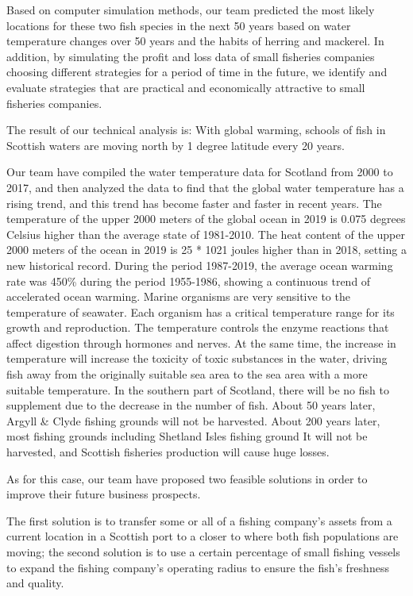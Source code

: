 \documentclass{mcmthesis}
\numberwithin{figure}{section}
\numberwithin{table}{section}
\begin{document}
Based on computer simulation methods, our team predicted the most likely locations for these two fish species in the next 50 years based on water temperature changes over 50 years and the habits of herring and mackerel. In addition, by simulating the profit and loss data of small fisheries companies choosing different strategies for a period of time in the future, we identify and evaluate strategies that are practical and economically attractive to small fisheries companies.

The result of our technical analysis is: With global warming, schools of fish in Scottish waters are moving north by 1 degree latitude every 20 years.

Our team have compiled the water temperature data for Scotland from 2000 to 2017, and then analyzed the data to find that the global water temperature has a rising trend, and this trend has become faster and faster in recent years. The temperature of the upper 2000 meters of the global ocean in 2019 is 0.075 degrees Celsius higher than the average state of 1981-2010. The heat content of the upper 2000 meters of the ocean in 2019 is 25 * 1021 joules higher than in 2018, setting a new historical record. During the period 1987-2019, the average ocean warming rate was 450\% during the period 1955-1986, showing a continuous trend of accelerated ocean warming. Marine organisms are very sensitive to the temperature of seawater. Each organism has a critical temperature range for its growth and reproduction. The temperature controls the enzyme reactions that affect digestion through hormones and nerves. At the same time, the increase in temperature will increase the toxicity of toxic substances in the water, driving fish away from the originally suitable sea area to the sea area with a more suitable temperature. In the southern part of Scotland, there will be no fish to supplement due to the decrease in the number of fish. About 50 years later, Argyll \& Clyde fishing grounds will not be harvested. About 200 years later, most fishing grounds including Shetland Isles fishing ground It will not be harvested, and Scottish fisheries production will cause huge losses.

As for this case, our team have proposed two feasible solutions  in order to improve their future business prospects.

The first solution is to transfer some or all of a fishing company's assets from a current location in a  Scottish port to a closer to where both fish populations are moving; the second solution is to use a certain percentage of small fishing vessels to expand the fishing company's operating radius to ensure the fish's freshness and quality. 
\end{document}
